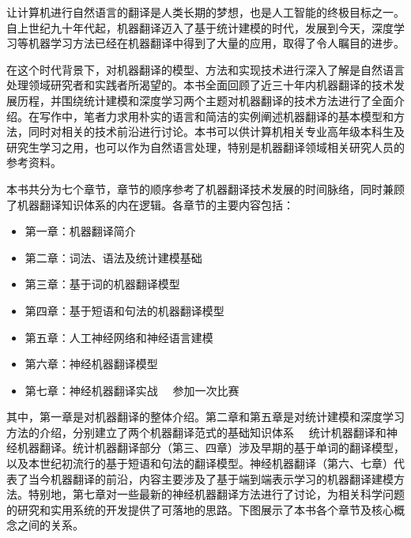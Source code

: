 \begin{spacing}{1.18}

让计算机进行自然语言的翻译是人类长期的梦想，也是人工智能的终极目标之一。自上世纪九十年代起，机器翻译迈入了基于统计建模的时代，发展到今天，深度学习等机器学习方法已经在机器翻译中得到了大量的应用，取得了令人瞩目的进步。

在这个时代背景下，对机器翻译的模型、方法和实现技术进行深入了解是自然语言处理领域研究者和实践者所渴望的。本书全面回顾了近三十年内机器翻译的技术发展历程，并围绕统计建模和深度学习两个主题对机器翻译的技术方法进行了全面介绍。在写作中，笔者力求用朴实的语言和简洁的实例阐述机器翻译的基本模型和方法，同时对相关的技术前沿进行讨论。本书可以供计算机相关专业高年级本科生及研究生学习之用，也可以作为自然语言处理，特别是机器翻译领域相关研究人员的参考资料。

本书共分为七个章节，章节的顺序参考了机器翻译技术发展的时间脉络，同时兼顾了机器翻译知识体系的内在逻辑。各章节的主要内容包括：

\begin{itemize}
\vspace{0.5em}
\item 第一章：机器翻译简介
\vspace{0.5em}
\item 第二章：词法、语法及统计建模基础
\vspace{0.5em}
\item 第三章：基于词的机器翻译模型
\vspace{0.5em}
\item 第四章：基于短语和句法的机器翻译模型
\vspace{0.5em}
\item 第五章：人工神经网络和神经语言建模
\vspace{0.5em}
\item 第六章：神经机器翻译模型
\vspace{0.5em}
\item 第七章：神经机器翻译实战 \ \dash \ 参加一次比赛
\vspace{0.5em}
\end{itemize}

其中，第一章是对机器翻译的整体介绍。第二章和第五章是对统计建模和深度学习方法的介绍，分别建立了两个机器翻译范式的基础知识体系 \ \dash \ 统计机器翻译和神经机器翻译。统计机器翻译部分（第三、四章）涉及早期的基于单词的翻译模型，以及本世纪初流行的基于短语和句法的翻译模型。神经机器翻译（第六、七章）代表了当今机器翻译的前沿，内容主要涉及了基于端到端表示学习的机器翻译建模方法。特别地，第七章对一些最新的神经机器翻译方法进行了讨论，为相关科学问题的研究和实用系统的开发提供了可落地的思路。下图展示了本书各个章节及核心概念之间的关系。


\end{spacing}
